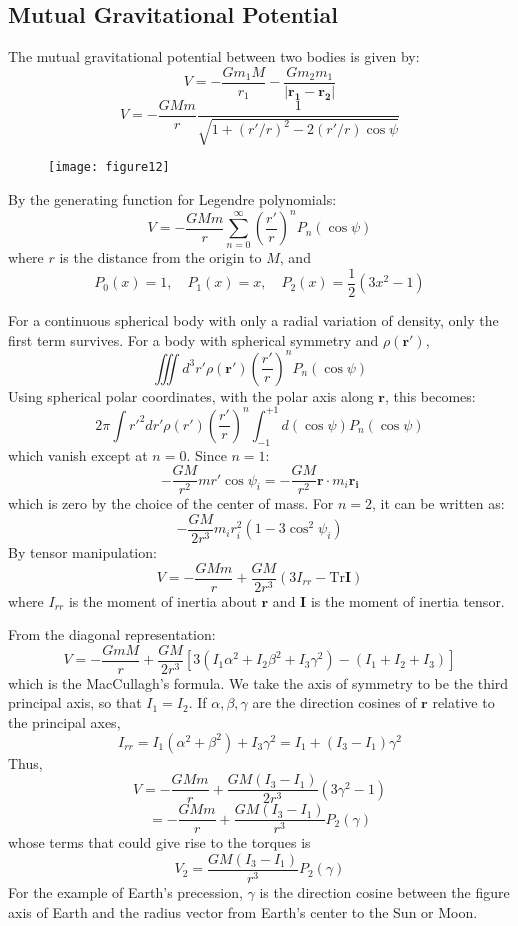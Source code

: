 \documentclass[12pt]{article}
\renewcommand{\vec}[1]{\mathbf{#1}}
\begin{document}
	\subsection*{Mutual Gravitational Potential}
	The mutual gravitational potential between two bodies is given by:
	\[ V = - \frac{G m_1 M}{r_1} - \frac{G m_2 m_1}{| \vec{r_1} - \vec{r_2} |} \]
	\[ V = - \frac{G M m}{r} \frac{1}{\sqrt{1 + (r'/r)^2 - 2(r'/r)\cos\psi}} \]
	
	\begin{figure}[h]
		\centering
		\texttt{[image: figure12]}
		\caption{}
		\label{fig:figure12}
	\end{figure}
	
	By the generating function for Legendre polynomials:
	\[ V = - \frac{G M m}{r} \sum_{n=0}^{\infty} (\frac{r'}{r})^n P_n(\cos\psi) \]
	where $r$ is the distance from the origin to $M$, and
	\[ P_0(x) = 1, \quad P_1(x) = x, \quad P_2(x) = \frac{1}{2}(3x^2 - 1) \]
	
	For a continuous spherical body with only a radial variation of density, only the first term survives.
	For a body with spherical symmetry and $\rho(\vec{r}')$,
	\[ \iiint d^3 r' \rho(\vec{r}') (\frac{r'}{r})^n P_n(\cos\psi) \]
	Using spherical polar coordinates, with the polar axis along $\vec{r}$, this becomes:
	\[ 2\pi \int r'^2 dr' \rho(r') (\frac{r'}{r})^n \int_{-1}^{+1} d(\cos\psi) P_n(\cos\psi) \]
	which vanish except at $n=0$.
	Since $n=1$:
	\[ - \frac{G M}{r^2} m r' \cos\psi_i = - \frac{G M}{r^2} \vec{r} \cdot m_i \vec{r_i} \]
	which is zero by the choice of the center of mass.
	For $n=2$, it can be written as:
	\[ - \frac{G M}{2r^3} m_i r_i^2 (1 - 3\cos^2\psi_i) \]
	By tensor manipulation:
	\[ V = - \frac{G M m}{r} + \frac{G M}{2r^3} (3I_{rr} - \mathrm{Tr}\boldsymbol{I}) \]
	where $I_{rr}$ is the moment of inertia about $\vec{r}$ and $\boldsymbol{I}$ is the moment of inertia tensor.
	
	From the diagonal representation:
	\[ V = - \frac{G m M}{r} + \frac{G M}{2r^3} [3(I_1\alpha^2 + I_2\beta^2 + I_3\gamma^2) - (I_1 + I_2 + I_3)] \]
	which is the MacCullagh's formula. We take the axis of symmetry to be the third principal axis, so that $I_1 = I_2$.
	If $\alpha, \beta, \gamma$ are the direction cosines of $\vec{r}$ relative to the principal axes,
	\[ I_{rr} = I_1(\alpha^2 + \beta^2) + I_3\gamma^2 = I_1 + (I_3 - I_1)\gamma^2 \]
	Thus,
	\[ V = - \frac{G M m}{r} + \frac{G M(I_3 - I_1)}{2r^3}(3\gamma^2 - 1) \]
	\[ = - \frac{G M m}{r} + \frac{G M(I_3 - I_1)}{r^3} P_2(\gamma) \]
	whose terms that could give rise to the torques is
	\[ V_2 = \frac{G M(I_3 - I_1)}{r^3} P_2(\gamma) \]
	For the example of Earth's precession, $\gamma$ is the direction cosine between the figure axis of Earth and the radius vector from Earth's center to the Sun or Moon. 
	
\end{document}

